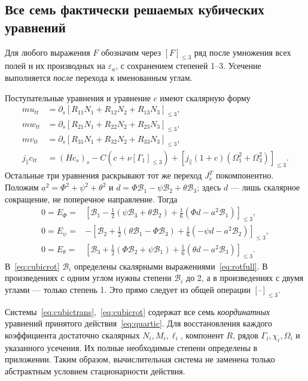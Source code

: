 \documentclass[11pt,a4paper]{article}
\newcommand{\trunc}[1]{\left[#1\right]_{\leq3}}
\begin{document}
\subsection{Все семь фактически решаемых кубических уравнений}
Для любого выражения $F$ обозначим через $[F]_{\leq3}$ ряд после умножения всех полей и их производных на $\varepsilon_a$, с сохранением степеней 1--3. Усечение выполняется \emph{после} перехода к именованным углам.

Поступательные уравнения и уравнение $c$ имеют скалярную форму
\begin{equation}
\boxed{\begin{aligned}
mu_{tt}&=\partial_s\trunc{R_{11}N_1+R_{12}N_2+R_{13}N_3},\\
mw_{tt}&=\partial_s\trunc{R_{21}N_1+R_{22}N_2+R_{23}N_3},\\
mv_{tt}&=\partial_s\trunc{R_{31}N_1+R_{32}N_2+R_{33}N_3},\\
j_\parallel c_{tt}&=(Hc_s)_s-C(c+\nu[\Gamma_1]_{\leq3})
+\trunc{j_\parallel(1+c)(\Omega_1^2+\Omega_3^2)}.
\end{aligned}}
\label{eq:cubictrans}
\end{equation}
Остальные три уравнения раскрывают тот же переход $J_r^T$ покомпонентно. Положим $a^2=\Phi^2+\psi^2+\theta^2$ и
$d=\Phi\mathcal B_1-\psi\mathcal B_2+\theta\mathcal B_3$; здесь $d$ --- лишь скалярное сокращение, не поперечное направление. Тогда
\begin{equation}
\boxed{\begin{aligned}
0=E_\Phi={}&\trunc{\mathcal B_1
-\tfrac12(\psi\mathcal B_3+\theta\mathcal B_2)
+\tfrac16(\Phi d-a^2\mathcal B_1)},\\
0=E_\psi={}&-\trunc{\mathcal B_2
+\tfrac12(\theta\mathcal B_1-\Phi\mathcal B_3)
+\tfrac16(-\psi d-a^2\mathcal B_2)},\\
0=E_\theta={}&\trunc{\mathcal B_3
+\tfrac12(\Phi\mathcal B_2+\psi\mathcal B_1)
+\tfrac16(\theta d-a^2\mathcal B_3)}.
\end{aligned}}
\label{eq:cubicrot}
\end{equation}
В~\eqref{eq:cubicrot} $\mathcal B_i$ определены скалярными выражениями~\eqref{eq:rotfull}. В произведениях с одним углом нужны степени $\mathcal B_i$ до 2, а в произведениях с двумя углами --- только степень 1. Это прямо следует из общей операции $[\cdot]_{\leq3}$.

Системы~\eqref{eq:cubictrans},~\eqref{eq:cubicrot} содержат все семь \emph{координатных} уравнений принятого действия~\eqref{eq:quartic}. Для восстановления каждого коэффициента достаточно скалярных $N_i,M_i,\ell_i$, компонент $R$, рядов $\Gamma_i,\chi_i,\Omega_i$ и указанного усечения. Их полные необходимые степени определены в приложении. Таким образом, вычислительная система не заменена только абстрактным условием стационарности действия.
\end{document}
